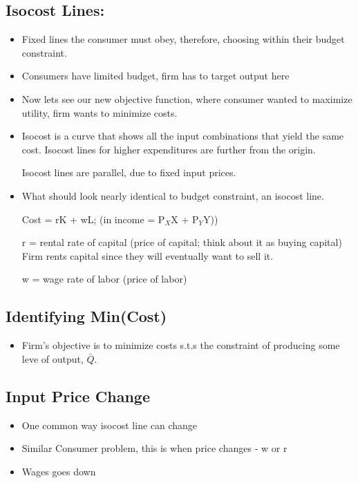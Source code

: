 \documentclass{article}
\begin{document}
\subsection{Isocost Lines:}
\begin{itemize}
  \item Fixed lines the consumer must obey,
    therefore, choosing within their budget constraint.
  \item Consumers have limited budget, firm has to target output here
  \item Now lets see our new objective function,
    where consumer wanted to maximize utility, firm wants to minimize costs.
  \item Isocost is a curve that shows all the input combinations that yield the same cost.
    Isocost lines for higher expenditures are further from the origin.

    Isocost lines are parallel, due to fixed input prices.
  \item What should look nearly identical to budget constraint, an isocost line.

    Cost = rK + wL; (in income = P$_X$X + P$_Y$Y))

    r = rental rate of capital (price of capital; think about it as buying capital)
    Firm rents capital since they will eventually want to sell it.

    w = wage rate of labor (price of labor)
\end{itemize}

\subsection{Identifying Min(Cost)}
\begin{itemize}
  \item Firm's objective is to minimize costs s.t.s the constraint
    of producing some leve of output, $\bar{Q}$.
\end{itemize}

\subsection{Input Price Change}
\begin{itemize}
  \item One common way isocost line can change
  \item Similar Consumer problem, this is when price changes - w or r
  \item Wages goes down
\end{itemize}
\end{document}
